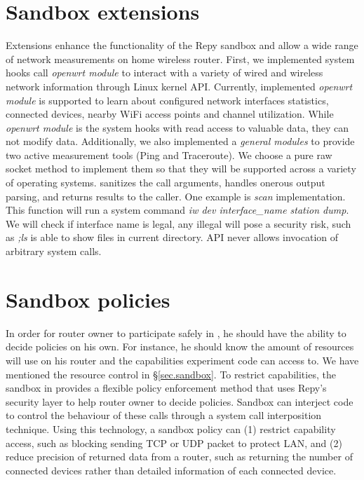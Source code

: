 \section{Sandbox extensions}
\label{sec.extensions}
Extensions enhance the functionality of the Repy sandbox and allow a wide range of network measurements on home wireless router. First, we implemented system hooks call \textit{openwrt module} to interact with a variety of wired and wireless network information through Linux kernel API. Currently, implemented \textit{openwrt module} is supported to learn about configured network interfaces statistics, connected devices, nearby WiFi access points and channel utilization. While \textit{openwrt module} is the system hooks with read access to valuable data, they can not modify data. Additionally, we also implemented a \textit{general modules} to provide two active measurement tools (Ping and Traceroute). We choose a pure raw socket method to implement them so that they will be supported across a variety of operating systems. \sysname sanitizes the call arguments, handles onerous output parsing, and returns results to the caller. One example is \textit{scan} implementation. This function will run a system command \textit{iw dev interface\_name station dump}. We will check if interface name is legal, any illegal will pose a security risk, such as \textit{;ls} is able to show files in current directory. \sysname API never allows invocation of arbitrary system calls. 

\section{Sandbox policies}
\label{sec.policy}
In order for router owner to participate safely in \sysname, he should have the ability to decide policies on his own. For instance, he should know the amount of resources \sysname will use on his router and the capabilities experiment code can access to. We have mentioned the resource control in \S{\ref{sec.sandbox}}. To restrict capabilities, the sandbox in \sysname provides a flexible policy enforcement method that uses Repy's security layer to help router owner to decide policies. Sandbox can interject code to control the behaviour of these calls through a system call interposition technique. Using this technology, a sandbox policy can (1) restrict capability access, such as blocking sending TCP or UDP packet to protect LAN, and (2) reduce precision of returned data from a router, such as returning the number of connected devices rather than detailed information of each connected device.

